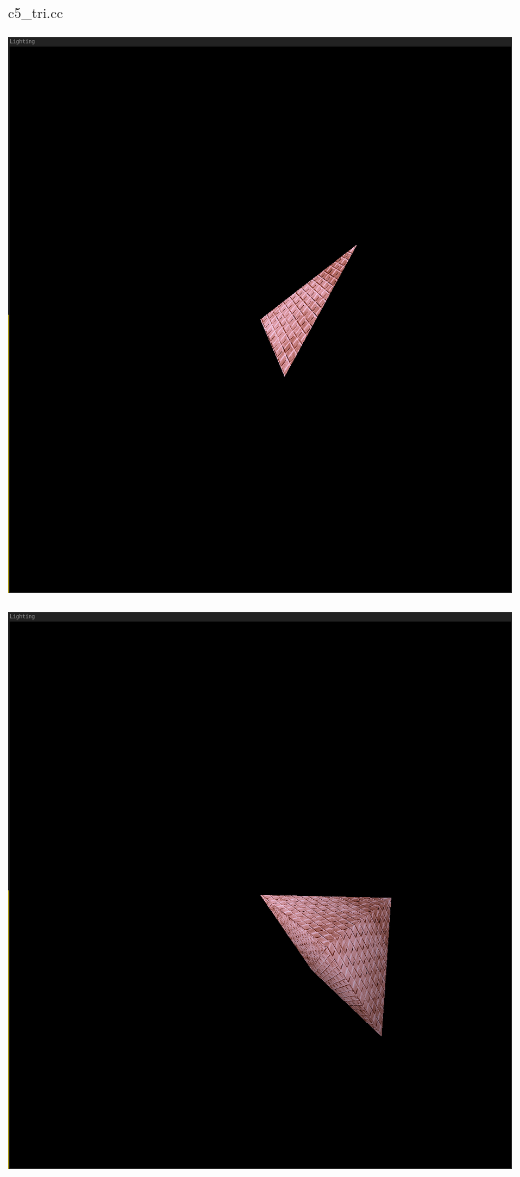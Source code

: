 \documentclass[polish,polish,a4paper]{report}
\begin{document}

{c5_tri.cc}

\begin{center}
\includegraphics[scale=1.5]{textri}
\end{center}

\begin{center}
\includegraphics[scale=2]{texpyra}
\end{center}
\end{document}

